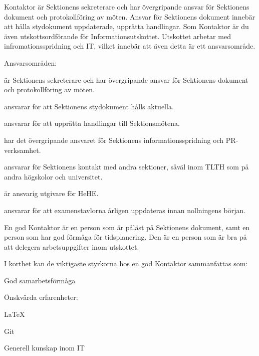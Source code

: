 \documentclass[10pt]{article}
\def\post{Kontaktor}
\def\doctitle{Kravprofil för \post}
\begin{document}
    \heading{\doctitle}
    
    
    Kontaktor är Sektionens sekreterare och har övergripande ansvar för Sektionens dokument och
    protokollföring av möten. Ansvar för Sektionens dokument innebär att hålla stydokument
    uppdaterade, upprätta handlingar. Som Kontaktor är du även utskottsordförande för
    Informationsutskottet. Utskottet arbetar med infromationsspridning och IT, vilket
    innebär att även detta är ett ansvarsområde.
    
    Ansvarsområden:
    \begin{dashlist}
        \item är Sektionens sekreterare och har övergripande ansvar för Sektionens dokument och
        protokollföring av möten.
        \item ansvarar för att Sektionens stydokument hålls aktuella.
        \item ansvarar för att upprätta handlingar till Sektionsmötena.
        \item har det övergripande ansvaret för Sektionens informationsspridning och PR-verksamhet.
        \item ansvarar för Sektionens kontakt med andra sektioner, såväl inom TLTH som på andra
        högskolor och universitet.
        \item är ansvarig utgivare för HeHE.
        \item ansvarar för att examenstavlorna årligen uppdateras innan nollningens början.
    \end{dashlist}
    
    En god Kontaktor är en person som är påläst på Sektionens dokument, samt en person som
    har god förmåga för tidsplanering. Den är en person som är bra på att delegera
    arbetsuppgifter inom utskottet. 
    
    I korthet kan de viktigaste styrkorna hos en god {\post} sammanfattas som:
    \begin{dashlist}
        \item God samarbetsförmåga
        \item 
    \end{dashlist}
    
    
    
    Önskvärda erfarenheter:
    \begin{dashlist}
        \item \LaTeX
        \item Git
        \item Generell kunskap inom IT
    \end{dashlist}
        
    
\end{document}
